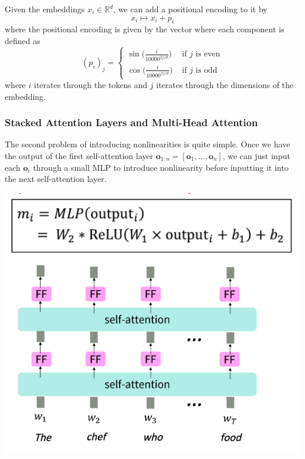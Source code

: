       \begin{definition}
        Given the embeddings $x_i \in \mathbb{R}^{d}$, we can add a positional encoding to it by 
        \[x_i \mapsto x_i + p_i\]
        where the positional encoding is given by the vector where each component is defined as 
        \begin{equation} 
          (p_i)_j =  \begin{cases} 
              \sin \big( \frac{i}{10000^{2j/d}} \big) & \text{ if } j \text{ is even} \\ 
              \cos \big( \frac{i}{10000^{2j/d}} \big) & \text{ if } j \text{ is odd}
          \end{cases}
        \end{equation}
        where $i$ iterates through the tokens and $j$ iterates through the dimensions of the embedding. 
      \end{definition}

    \subsubsection{Stacked Attention Layers and Multi-Head Attention}

      The second problem of introducing nonlinearities is quite simple. Once we have the output of the first self-attention layer $\mathbf{o}_{1:n} = [\mathbf{o}_1, \ldots, \mathbf{o}_n]$, we can just input each $\mathbf{o}_i$ through a small MLP to introduce nonlinearity before inputting it into the next self-attention layer. 

      \begin{center}
        \includegraphics[scale=0.4]{img/stacked_self_attention_layers.png}
      \end{center}

